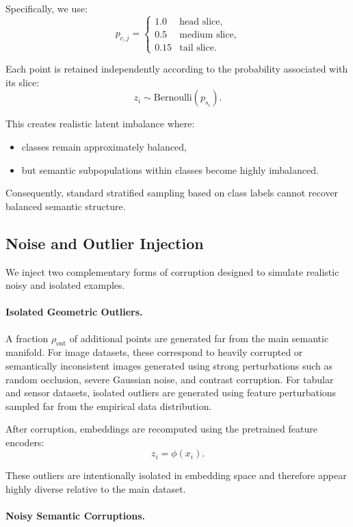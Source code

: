 \documentclass[11pt]{article}
\begin{document}
Specifically, we use:
\[
p_{c,j}
=
\begin{cases}
1.0 & \text{head slice},\\
0.5 & \text{medium slice},\\
0.15 & \text{tail slice}.
\end{cases}
\]

Each point is retained independently according to the probability associated with its slice:
\[
z_i \sim \text{Bernoulli}(p_{s_i}).
\]

This creates realistic latent imbalance where:
\begin{itemize}
    \item classes remain approximately balanced,
    \item but semantic subpopulations within classes become highly imbalanced.
\end{itemize}

Consequently, standard stratified sampling based on class labels cannot recover balanced semantic structure.

\subsection{Noise and Outlier Injection}

We inject two complementary forms of corruption designed to simulate realistic noisy and isolated examples.

\paragraph{Isolated Geometric Outliers.}

A fraction $\rho_{\text{out}}$ of additional points are generated far from the main semantic manifold. For image datasets, these correspond to heavily corrupted or semantically inconsistent images generated using strong perturbations such as random occlusion, severe Gaussian noise, and contrast corruption. For tabular and sensor datasets, isolated outliers are generated using feature perturbations sampled far from the empirical data distribution.

After corruption, embeddings are recomputed using the pretrained feature encoders:
\[
z_i=\phi(x_i).
\]

These outliers are intentionally isolated in embedding space and therefore appear highly diverse relative to the main dataset.

\paragraph{Noisy Semantic Corruptions.}
\end{document}

